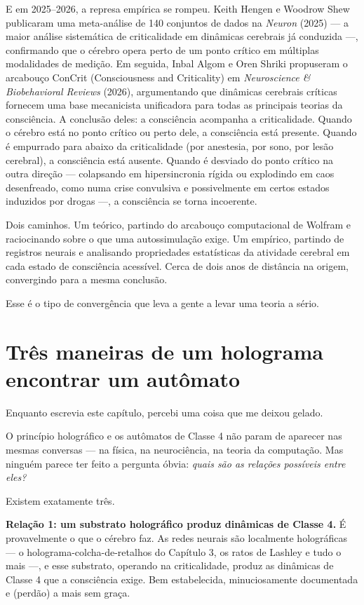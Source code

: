 \documentclass[11pt, twoside, openright]{book}
\begin{document}
E em 2025--2026, a represa empírica se rompeu. Keith Hengen e Woodrow Shew publicaram uma meta-análise de 140 conjuntos de dados na \textit{Neuron} (2025) --- a maior análise sistemática de criticalidade em dinâmicas cerebrais já conduzida ---, confirmando que o cérebro opera perto de um ponto crítico em múltiplas modalidades de medição. Em seguida, Inbal Algom e Oren Shriki propuseram o arcabouço ConCrit (Consciousness and Criticality) em \textit{Neuroscience \& Biobehavioral Reviews} (2026), argumentando que dinâmicas cerebrais críticas fornecem uma base mecanicista unificadora para todas as principais teorias da consciência. A conclusão deles: a consciência acompanha a criticalidade. Quando o cérebro está no ponto crítico ou perto dele, a consciência está presente. Quando é empurrado para abaixo da criticalidade (por anestesia, por sono, por lesão cerebral), a consciência está ausente. Quando é desviado do ponto crítico na outra direção --- colapsando em hipersincronia rígida ou explodindo em caos desenfreado, como numa crise convulsiva e possivelmente em certos estados induzidos por drogas ---, a consciência se torna incoerente.

Dois caminhos. Um teórico, partindo do arcabouço computacional de Wolfram e raciocinando sobre o que uma autossimulação exige. Um empírico, partindo de registros neurais e analisando propriedades estatísticas da atividade cerebral em cada estado de consciência acessível. Cerca de dois anos de distância na origem, convergindo para a mesma conclusão.

Esse é o tipo de convergência que leva a gente a levar uma teoria a sério.

\section*{Três maneiras de um holograma encontrar um autômato}

Enquanto escrevia este capítulo, percebi uma coisa que me deixou gelado.

O princípio holográfico e os autômatos de Classe 4 não param de aparecer nas mesmas conversas --- na física, na neurociência, na teoria da computação. Mas ninguém parece ter feito a pergunta óbvia: \textit{quais são as relações possíveis entre eles?}

Existem exatamente três.

\textbf{Relação 1: um substrato holográfico produz dinâmicas de Classe 4.} É provavelmente o que o cérebro faz. As redes neurais são localmente holográficas --- o holograma-colcha-de-retalhos do Capítulo 3, os ratos de Lashley e tudo o mais ---, e esse substrato, operando na criticalidade, produz as dinâmicas de Classe 4 que a consciência exige. Bem estabelecida, minuciosamente documentada e (perdão) a mais sem graça.
\end{document}

